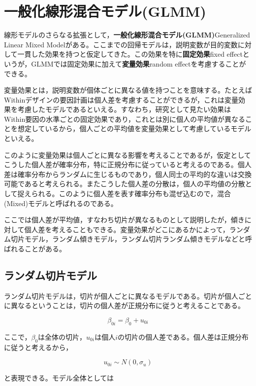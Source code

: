 \documentclass[
  a4paper,
]{ltjsbook}
\begin{document}
\section{一般化線形混合モデル(GLMM)}\label{ux4e00ux822cux5316ux7ddaux5f62ux6df7ux5408ux30e2ux30c7ux30ebglmm}

線形モデルのさらなる拡張として，\textbf{一般化線形混合モデル(GLMM)}Generalized
Linear Mixed
Modelがある。ここまでの回帰モデルは，説明変数が目的変数に対して一貫した効果を持つと仮定してきた。この効果を特に\textbf{固定効果}fixed
effectというが，GLMMでは固定効果に加えて\textbf{変量効果}random
effectを考慮することができる。

変量効果とは，説明変数が個体ごとに異なる値を持つことを意味する。たとえばWithinデザインの要因計画は個人差を考慮することができるが，これは変量効果を考慮したモデルであるといえる。すなわち，研究として見たい効果はWithin要因の水準ごとの固定効果であり，これとは別に個人の平均値が異なることを想定しているから，個人ごとの平均値を変量効果として考慮しているモデルといえる。

このように変量効果は個人ごとに異なる影響を考えることであるが，仮定としてこうした個人差が確率分布，特に正規分布に従っていると考えるのである。個人差は確率分布からランダムに生じるものであり，個人同士の平均的な違いは交換可能であると考えられる。またこうした個人差の分散は，個人の平均値の分散として捉えられる。このように個人差を表す確率分布も混ぜ込むので，混合(Mixed)モデルと呼ばれるのである。

ここでは個人差が平均値，すなわち切片が異なるものとして説明したが，傾きに対して個人差を考えることもできる。変量効果がどこにあるかによって，ランダム切片モデル，ランダム傾きモデル，ランダム切片ランダム傾きモデルなどと呼ばれることがある。

\subsection{ランダム切片モデル}\label{ux30e9ux30f3ux30c0ux30e0ux5207ux7247ux30e2ux30c7ux30eb}

ランダム切片モデルは，切片が個人ごとに異なるモデルである。切片が個人ごとに異なるということは，切片の個人差が正規分布に従うと考えることである。

\[
\beta_{0i} = \beta_0 + u_{0i}
\]

ここで，\(\beta_0\)は全体の切片，\(u_{0i}\)は個人\(i\)の切片の個人差である。個人差は正規分布に従うと考えるから，

\[
u_{0i} \sim N(0, \sigma_u)
\]

と表現できる。モデル全体としては
\end{document}
